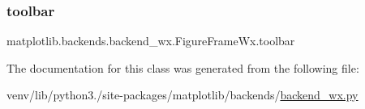 \subsubsection{\texorpdfstring{toolbar}{toolbar}}
{\footnotesize\ttfamily matplotlib.\+backends.\+backend\+\_\+wx.\+Figure\+Frame\+Wx.\+toolbar}



The documentation for this class was generated from the following file\+:\begin{DoxyCompactItemize}
\item 
venv/lib/python3./site-\/packages/matplotlib/backends/\hyperlink{backend__wx_8py}{backend\+\_\+wx.\+py}\end{DoxyCompactItemize}
